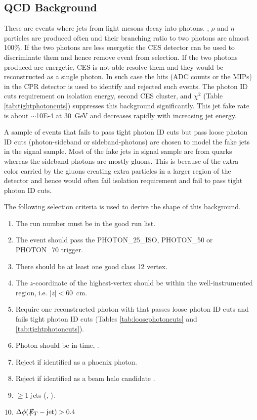 \documentclass[11pt]{article}
\begin{document}
\subsection{QCD Background}\label{sec:QCDbackground}
These are events where jets from light mesons decay into photons. \pizero, $\rho$ and $\eta$ particles are produced often and their branching ratio to two photons are almost 100\%. If the two photons are less energetic the CES detector can be used to discriminate them and hence remove event from selection. If the two photons produced are energetic, CES is not able resolve them and they would be reconstructed as a single photon. In such case the hits (ADC counts or the MIPs) in the CPR detector is used to identify and rejected such events. The photon ID cuts requirement on isolation energy, second CES cluster, and $\chi^{2}$ (Table \ref{tab:tightphotoncuts}) suppresses this background significantly. This jet fake rate is about $\sim$10E-4 at 30~GeV and decreases rapidly with increasing jet energy.

A sample of events that fails to pass tight photon ID cuts but pass loose photon ID cuts (photon-sideband or sideband-photons) are chosen  to model the fake jets in the signal sample. Most of the fake jets in signal sample are from quarks whereas the sideband photons are mostly gluons. This is because of the extra color carried by the gluons creating extra particles in a larger region of the detector and hence would often fail isolation requirement and fail to pass tight photon ID cuts.

The following selection criteria is used to derive the shape of this background.
\begin{enumerate}
	\item The run number must be in the good run list.
	\item The event should pass the PHOTON\_25\_ISO, PHOTON\_50 or \mbox{PHOTON\_70} trigger.
	\item There should be at least one good class 12 vertex.
	\item The $z$-coordinate of the highest-\pt vertex should be within the well-instrumented region, i.e. \mbox{$|z|<60$~cm}.
	\item Require one reconstructed photon with  that passes loose photon ID cuts and fails tight photon ID cuts (Tables \ref{tab:loosephotoncuts} and \ref{tab:tightphotoncuts}).
	\item Photon should be in-time, \intimewindow.
	\item Reject if identified as a phoenix photon.
	\item Reject if identified as a beam halo candidate .
	\item $\geq$1 jets (, ).
	\item $\Delta \phi(\met - \mathrm{jet})>0.4$
\end{enumerate}
\end{document}
